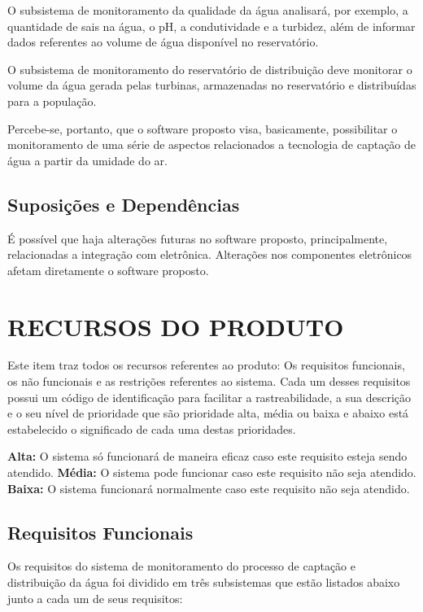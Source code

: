   O subsistema de monitoramento da qualidade da água analisará, por exemplo, a quantidade de sais na água, o pH, a condutividade e a 
  turbidez, além de informar dados referentes ao volume de água disponível no reservatório.
  
  O subsistema de monitoramento do reservatório de distribuição deve monitorar o volume da água gerada pelas turbinas, armazenadas
  no reservatório e distribuídas para a população.
  
  Percebe-se, portanto, que o software proposto visa, basicamente, possibilitar o monitoramento de uma série de aspectos relacionados a 
  tecnologia de captação de água a partir da umidade do ar.
  
  
  \subsection*{Suposições e Dependências}
  É possível que haja alterações futuras no software proposto, principalmente, relacionadas a integração com eletrônica. Alterações 
  nos componentes eletrônicos afetam diretamente o software proposto.
  
  
  \section*{RECURSOS DO PRODUTO}
  Este item traz todos os recursos referentes ao produto: Os requisitos funcionais, os não funcionais e as restrições referentes 
  ao sistema. Cada um desses requisitos possui um código de identificação para facilitar a rastreabilidade, a sua descrição e 
  o seu nível de prioridade que são prioridade alta, média ou baixa e abaixo está estabelecido o significado de cada uma 
  destas prioridades.
  
  \textbf{Alta:}  O sistema só funcionará de maneira eficaz caso este requisito esteja sendo atendido.
  \textbf{Média:} O sistema pode funcionar caso este requisito não seja atendido.
  \textbf{Baixa:} O sistema funcionará 	normalmente caso este requisito não seja atendido.
  
  
  \subsection*{Requisitos Funcionais}
  
  Os requisitos do sistema de monitoramento do processo de captação e distribuição da água foi dividido em 
  três subsistemas que estão listados abaixo junto a cada um de seus requisitos:
  \pagebreak
  
